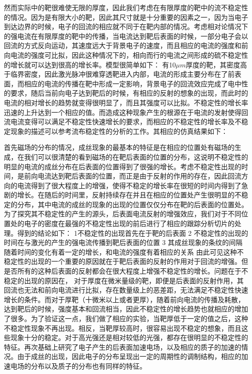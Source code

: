 然而实际中的靶很难使无限的厚度，因此我们考虑在有限厚度的靶中的流不稳定性的情况。因为是有限大小的靶，因此其尺寸就是十分重要的因素之一，因为当电子到达边界的时候，电子的回流的相应就不同于在靶内部的情况。考虑相对论情况下的强电流在有限厚度的靶中的传播，当电流达到靶后表面的时候，一部分电子会以回流的方式反向运动，其速度远大于背景电子的速度，而且相应的电流的强度和前向电流的强度可比拟，因此这种情况下的，相向而行的电流之间形成的硫不稳定性的增长就可以达到很高的增长率。模型很简单如下： 有10$\mu m$厚度的靶，其密度高于临界密度，因此激光脉冲很难穿透靶进入内部，电流的形成主要分布在了前表面，而相应的电流的传播在靶中形成一定影响，背景电子的回流效应完成了电中性的要求，随后当前向电子达到靶后的时候，有相应的反射的想象的出现，而此时的电流的相对增长的趋势就变得很明显了，而且其强度可以比拟。不稳定性的增长率迅速的上升达到一个相应的值。而造成这种现象产生的根源在于电流的发射使得回流电流变得可以满足不稳定性快速增长的要求，而相应的不稳定性的增长率及不稳定现象的描述可以参考流布稳定性的分析的工作。其相应的仿真结果如下：

首先磁场的分布的情况，成丝现象的最基本的特征是在相应的位置处有磁场的生成，在我们可以很清楚的看到磁场的在靶后表面的位置的分布，这说明不稳定性的明显的电流的成丝分布在后表面的位置得到了很强的增长。考虑不稳定性出现的时间，是前向电流达到靶后表面的位置，而正是由于反射的作用的存在，因此回流方向的电流得到了很大程度上的增强，使得不稳定的增长率在很短的时间内得到了急剧的增长。在随后的时间里，反射持续存在并且在相应的位置处产生很明显的不稳定的分布，其中电流的成丝的现象的出现的位置仅仅分布在靶的后表面的位置处。为了探究其不稳定性的产生的源头，后表面电流反射的增强效应，我们对于不同位置处的电子的密度在最强的不稳定性出现的前后进行了相应的跟踪分析切片的处理。得到的结论如下：
1不稳定性的出现首先在于靶的后表面
2 不稳定性的出现的时间在与激光的产生的强电流传播到靶后表面的位置
3 其成丝现象的条纹的间隔随着时间的变化有着一定的增长，和电流的强度有着相应的关系
由此可见这种不稳定性的出现的一个重要的原因就在于靶后表面的反射的作用对于回流的增强。但是否所有的这种后表面的反射都会在很大程度上增强不稳定性的增长。问题在于不稳定的出现的原因在， 对于厚度在微米量级的靶，即便是后表面的反射作用，其回流也无法和前向电流进行比拟，存在数量级上的恶差距，无法满足不稳定性快速增长的条件。而对于厚靶（十微米以上或者更厚），随着前向电流的传播及耗散，达到靶后的时候，强度基本和回流相当，因此不稳定性的增长趋势也就相应的增加了很多。为了验证这一点，我们做了相应的实验，当靶厚低于一定的值之后，这种不稳定性现象不再出现。相反，当靶厚较高时，很容易出现不稳定的想象，而且这些现象十分的稳定。对于高光强还是相对较低的光强，都存在很明显的不稳定性的特征。再次基础上研究了电子产生的后表面加速电场，以及相应的质子的加速的情况。由于成丝的出现，因此电子的分布呈现出一定的周期性的调制结构，相应的加速电场的分布以及质子的分布也有同样的特征。
